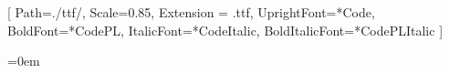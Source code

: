 \usepackage{fontspec}

\setmonofont{Cascadia}[
Path=./ttf/,
Scale=0.85,
Extension = .ttf,
UprightFont=*Code,              %
BoldFont=*CodePL,               %
ItalicFont=*CodeItalic,
BoldItalicFont=*CodePLItalic
]

\usepackage{ragged2e}
\parindent=0em               %
